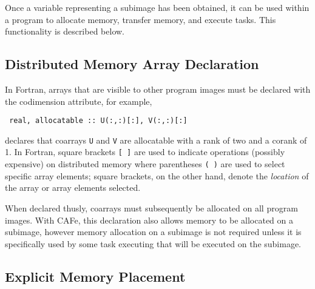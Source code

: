 Once a variable representing a subimage has been obtained, it can be used within a program
to allocate memory, transfer memory, and execute tasks.  This functionality is described below.


\subsection{Distributed Memory Array Declaration}

In Fortran, arrays that are visible to other program images must be declared with the
codimension attribute, for example,
\small
\begin{verbatim}
 real, allocatable :: U(:,:)[:], V(:,:)[:]
\end{verbatim}
\normalsize
declares that coarrays \texttt{U} and \texttt{V} are allocatable with a rank of two and a
corank of 1.  In Fortran, square brackets \texttt{[ ]} are used to indicate operations
(possibly expensive) on distributed memory where parentheses \texttt{( )} are used to
select specific array elements; square brackets, on the other hand, denote the
\emph{location} of the array or array elements selected.

When declared thusly, coarrays must subsequently be allocated on all program images.  With
CAFe, this declaration also allows memory to be allocated on a subimage, however memory
allocation on a subimage is not required unless it is specifically used by some task
executing that will be executed on the subimage.


\subsection{Explicit Memory Placement}

